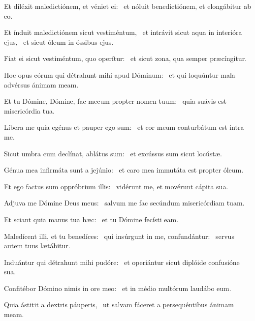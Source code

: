 \item Et diléxit maledictiónem, et véniet ei:~\psstar{} et nóluit benedictiónem, et elongábitur ab eo.

\item Et índuit maledictiónem sicut vestiméntum,~\pscross{} et intrávit sicut aqua in interióra ejus,~\psstar{} et sicut óleum in óssibus ejus.

\item Fiat ei sicut vestiméntum, quo operítur:~\psstar{} et sicut zona, qua semper præcíngitur.

\item Hoc opus eórum qui détrahunt mihi apud Dóminum:~\psstar{} et qui loquúntur mala advérsus ánimam meam.

\item Et tu Dómine, Dómine, fac mecum propter nomen tuum:~\psstar{} quia suávis est misericórdia tua.

\item Líbera me quia egénus et pauper ego sum:~\psstar{} et cor meum conturbátum est intra me.

\item Sicut umbra cum declínat, ablátus sum:~\psstar{} et excússus sum sicut locústæ.

\item Génua mea infirmáta sunt a jejúnio:~\psstar{} et caro mea immutáta est propter óleum.

\item Et ego factus sum oppróbrium illis:~\psstar{} vidérunt me, et movérunt cápita sua.

\item Adjuva me Dómine Deus meus:~\psstar{} salvum me fac secúndum misericórdiam tuam.

\item Et sciant quia manus tua hæc:~\psstar{} et tu Dómine fecísti eam.

\item Maledícent illi, et tu benedíces:~\pscross{} qui insúrgunt in me, confundántur:~\psstar{} servus autem tuus lætábitur.

\item Induántur qui détrahunt mihi pudóre:~\psstar{} et operiántur sicut diplóide confusióne sua.

\item Confitébor Dómino nimis in ore meo:~\psstar{} et in médio multórum laudábo eum.

\item Quia ástitit a dextris páuperis,~\psstar{} ut salvam fáceret a persequéntibus ánimam meam.

